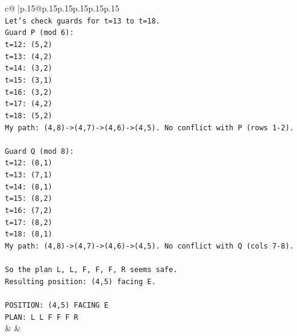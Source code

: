 \documentclass{article}
\begin{document}
{\begin{supertabular}{c@{$\;$}|p{.15\linewidth}@{}p{.15\linewidth}p{.15\linewidth}p{.15\linewidth}p{.15\linewidth}p{.15\linewidth}}
{{{\\ 
\texttt{Let's check guards for t=13 to t=18.} \\
\texttt{Guard P (mod 6):} \\
\texttt{t=12: (5,2)} \\
\texttt{t=13: (4,2)} \\
\texttt{t=14: (3,2)} \\
\texttt{t=15: (3,1)} \\
\texttt{t=16: (3,2)} \\
\texttt{t=17: (4,2)} \\
\texttt{t=18: (5,2)} \\
\texttt{My path: (4,8){-}>(4,7){-}>(4,6){-}>(4,5). No conflict with P (rows 1{-}2).} \\
\\ 
\texttt{Guard Q (mod 8):} \\
\texttt{t=12: (8,1)} \\
\texttt{t=13: (7,1)} \\
\texttt{t=14: (8,1)} \\
\texttt{t=15: (8,2)} \\
\texttt{t=16: (7,2)} \\
\texttt{t=17: (8,2)} \\
\texttt{t=18: (8,1)} \\
\texttt{My path: (4,8){-}>(4,7){-}>(4,6){-}>(4,5). No conflict with Q (cols 7{-}8).} \\
\\ 
\texttt{So the plan L, L, F, F, F, R seems safe.} \\
\texttt{Resulting position: (4,5) facing E.} \\
\\ 
\texttt{POSITION: (4,5) FACING E} \\
\texttt{PLAN: L L F F F R} \\
            }
        }
    }
    & & \\ \\


\end{supertabular}}
\end{document}
